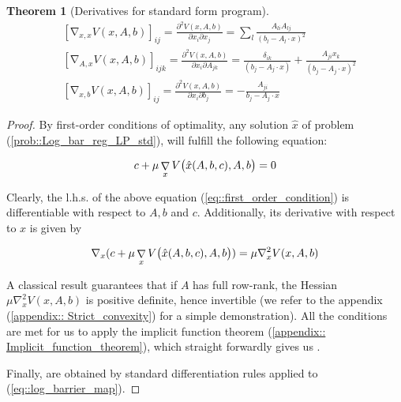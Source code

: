 \documentclass[12pt]{article}
\DeclareMathOperator{\grad}{\mathop{\nabla}}
\newcommand{\dotprod}[2]{#1\mathbin{\cdot}#2}
\newcommand{\pa}[1]{\left( #1 \right)}
\newcommand{\bpa}[1]{\big( #1 \big)}
\newcommand{\br}[1]{\left[ #1 \right]}
\newtheorem{theorem}{Theorem}
\begin{document}
\begin{theorem}[Derivatives for standard form program]
\begin{subequations}
\label{eq::log_bar_derivatives}
\begin{align}
    \label{eq::log_bar_der_x_x}
    &\br{\grad_{x,x} V(x, A, b)}_{ij} = \frac{\partial^2 V(x, A, b)}{\partial x_i \partial x_j} 
    = \sum_l \frac{A_{li}A_{lj}}{\pa{b_l - \dotprod{A_l}{x}}^2} \\
    \label{eq::log_bar_der_x_A}
    &\br{\grad_{A,x} V(x, A, b)}_{ijk}
    = \frac{\partial^2 V(x, A, b)}{\partial x_i \partial A_{jk}} 
    = \frac{\delta_{ik}}{(b_j-\dotprod{A_{j}}{x})} + \frac{A_{ji}x_k}{\pa{b_j - \dotprod{A_j}{x}}^2} \\
    \label{eq::log_bar_der_x_b}
    & \br{\grad_{x,b} V(x, A, b)}_{ij} 
    = \frac{\partial^2 V(x, A, b)}{\partial x_i \partial b_j}
    = -\frac{A_{ji}}{b_j-\dotprod{A_j}{x}}
\end{align}
\end{subequations}

\end{theorem}
\begin{proof}
    By first-order conditions of optimality, any solution $\hat x$ of problem (\ref{prob::Log_bar_reg_LP_std}), 
    will fulfill the following equation:

    \begin{align}
    \label{eq::first_order_condition}
    c + \mu \grad_x V\bpa{\xopt, A, b} = 0
    \end{align}

    Clearly, the l.h.s. of the above equation (\ref{eq::first_order_condition}) is differentiable with respect to
    $A, b$ and $c$. 
    Additionally, its derivative with respect to $x$ is given by 
    
    \begin{align}
        \label{eq::der_x_lhs_first_order}
        \nabla_x(c + \mu \grad_x V\bpa{\xopt, A, b}) =  \mu \nabla^2_x V(x, A, b)
    \end{align}

    A classical result guarantees that if $A$ has full row-rank, the Hessian $\mu \nabla^2_x V(x, A, b)$ is positive definite, hence invertible 
    (we refer to the appendix (\ref{appendix:: Strict_convexity}) for a simple demonstration).
    All the conditions are met for us to apply the implicit function theorem (\ref{appendix:: Implicit_function_theorem}),
    which straight forwardly gives us .

    Finally,  are obtained by standard differentiation rules applied
    to (\ref{eq::log_barrier_map}).


\end{proof}
\end{document}
